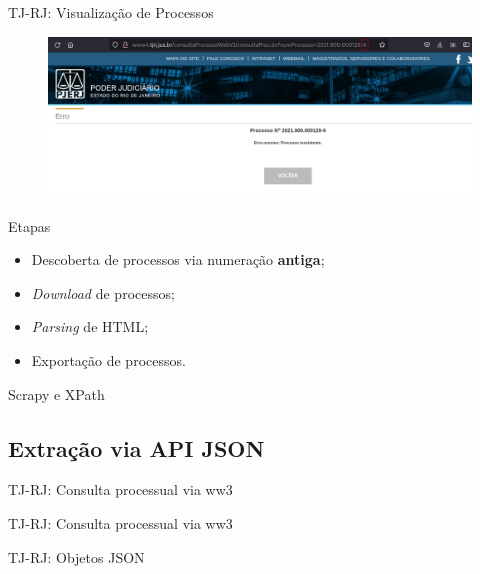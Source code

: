 \begin{frame}{TJ-RJ: Visualização de Processos}
    \begin{figure}[htb]
        \includegraphics[keepaspectratio,width=1\textwidth]{img/tj-rj-2}
    \end{figure}
\end{frame}

\begin{frame}{Etapas}
    \begin{itemize}
        \item Descoberta de processos via numeração \textbf{antiga};
        \item \textit{Download} de processos;
        \item \textit{Parsing} de HTML;
        \item Exportação de processos.
    \end{itemize}
\end{frame}

\begin{frame}{Scrapy e XPath}
\end{frame}

\subsection{Extração via API JSON}

\begin{frame}{TJ-RJ: Consulta processual via ww3}
\end{frame}

\begin{frame}{TJ-RJ: Consulta processual via ww3}
\end{frame}

\begin{frame}{TJ-RJ: Objetos JSON}
\end{frame}

